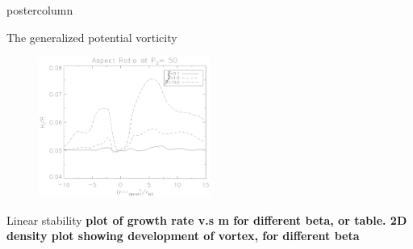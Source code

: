 \documentclass[final,hyperref={pdfpagelabels=false}]{beamer}
\begin{document}
\begin{frame}
\begin{columns}
\begin{column}{.49\textwidth}
\begin{beamercolorbox}[center,wd=\textwidth]{postercolumn}
\begin{minipage}[T]{.95\textwidth}
{\begin{block}{{\Large The generalized potential vorticity}}
                  \begin{figure}
                    \centering
                    \includegraphics[width=0.5\textwidth]{Posterfig_HR}
                  \end{figure}
                  
            \end{block}
            
            \vfill

            \begin{block}{{\Large Linear stability}}
              \justifying
                  {\bf plot of growth rate v.s m for different beta,
                    or table. 2D density plot showing development of
                    vortex, for different beta}


\end{block}}
\end{minipage}
\end{beamercolorbox}
\end{column}
\end{columns}
\end{frame}
\end{document}
